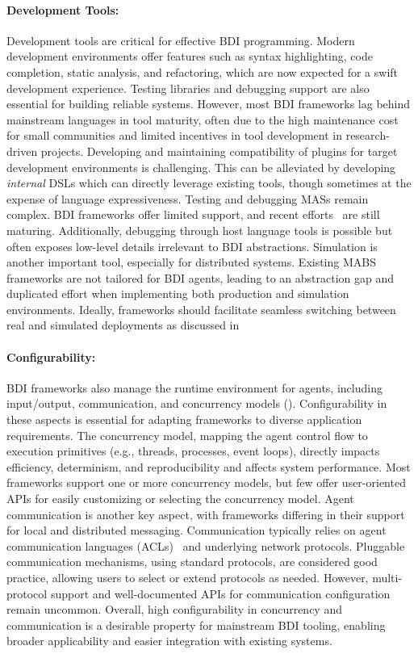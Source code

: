 \paragraph{Development Tools:}
Development tools are critical for effective \ac{BDI} programming.
Modern development environments offer features such as syntax highlighting, code completion, static analysis, and refactoring, which are now expected for a swift development experience.
%
Testing libraries and debugging support are also essential for building reliable systems. However, most \ac{BDI} frameworks lag behind mainstream languages in tool maturity, often due to the high maintenance cost for small communities and limited incentives in tool development in research-driven projects.
%
Developing and maintaining compatibility of plugins for target development environments is challenging.
%
This can be alleviated by developing \emph{internal} \acp{DSL} which can directly leverage existing tools, though sometimes at the expense of language expressiveness.
%
Testing and debugging \acp{MAS} remain complex. \ac{BDI} frameworks offer limited support, and recent efforts~\cite{DBLP:conf/atal/RodriguezTW23,amaral2023atal} are still maturing. Additionally, debugging through host language tools is possible but often exposes low-level details irrelevant to \ac{BDI} abstractions.
%
Simulation is another important tool, especially for distributed systems. Existing \ac{MABS} frameworks are not tailored for \ac{BDI} agents, leading to an abstraction gap and duplicated effort when implementing both production and simulation environments. Ideally, frameworks should facilitate seamless switching between real and simulated deployments as discussed in 

\paragraph{Configurability:}
\ac{BDI} frameworks also manage the runtime environment for agents, including input/output, communication, and concurrency models (). Configurability in these aspects is essential for adapting frameworks to diverse application requirements.
%
The concurrency model, mapping the agent control flow to execution primitives (e.g., threads, processes, event loops), directly impacts efficiency, determinism, and reproducibility and affects system performance. Most frameworks support one or more concurrency models, but few offer user-oriented APIs for easily customizing or selecting the concurrency model.
%
Agent communication is another key aspect, with frameworks differing in their support for local and distributed messaging. Communication typically relies on agent communication languages (ACLs)~\cite{Kone_Shimazu_Nakajima_2000} and underlying network protocols.
%
Pluggable communication mechanisms, using standard protocols, are considered good practice, allowing users to select or extend protocols as needed. However, multi-protocol support and well-documented APIs for communication configuration remain uncommon.
%
Overall, high configurability in concurrency and communication is a desirable property for mainstream \ac{BDI} tooling, enabling broader applicability and easier integration with existing systems.


